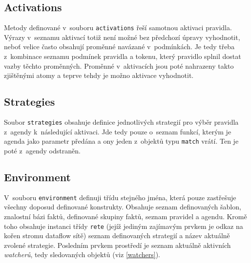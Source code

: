 \subsection{Activations}
Metody definované v~souboru \verb|activations| řeší samotnou aktivaci pravidla.
Výrazy v~seznamu aktivací totiž není možné bez předchozí úpravy vyhodnotit,
neboť velice často obsahují proměnné navázané v~podmínkách. Je tedy třeba
z~kombinace seznamu podmínek pravidla a tokenu, který pravidlo splnil dostat
vazby těchto proměnných. Proměnné v~aktivacích jsou poté nahrazeny takto
zjištěnými atomy a teprve tehdy je možno aktivace vyhodnotit.
\subsection{Strategies}
Soubor \verb|strategies| obsahuje definice jednotlivých strategií pro výběr
pravidla z~agendy k~následující aktivaci. Jde tedy pouze o~seznam funkcí,
kterým je agenda jako parametr předána a ony jeden z~objektů typu \verb|match|
vrátí. Ten je poté z~agendy odstraněn.
\subsection{Environment}
V~souboru \verb|environment| definuji třídu stejného jména, která pouze
zastřešuje všechny doposud definované konstrukty. Obsahuje seznam definovaných
šablon, znalostní bázi faktů, definované skupiny faktů, seznam pravidel
a agendu. Kromě toho obsahuje instanci třídy \verb|rete| (jejíž jediným
zajímavým prvkem je odkaz na kořen stromu dataflow sítě) seznam definovaných
strategií a název aktuálně zvolené strategie. Posledním prvkem prostředí
je seznam aktuálně aktivních \emph{watcherů}, tedy sledovaných objektů
(viz \ref{watchers}).
